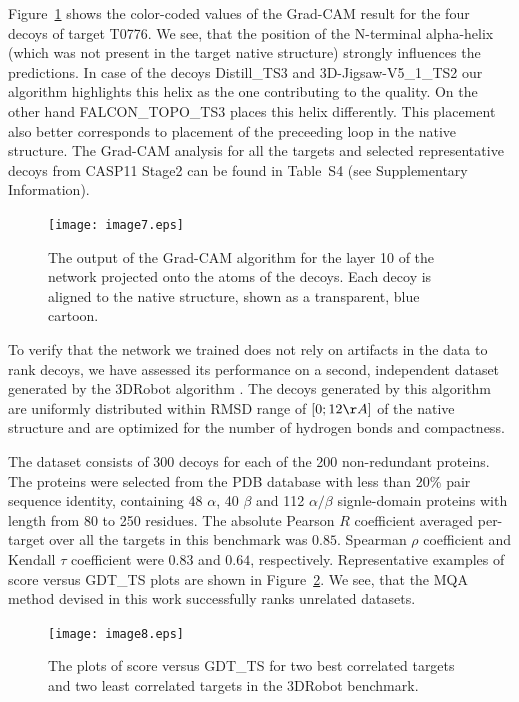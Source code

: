 \documentclass{bioinfo}
\begin{document}
Figure~\ref{Fig:GradCAMT0776_more} shows the color-coded
values of the Grad-CAM result for the four decoys of target T0776.
We see, that the position of the N-terminal alpha-helix (which was not present in the target native structure) 
strongly influences the predictions. In case of the decoys Distill\_TS3 and 3D-Jigsaw-V5\_1\_TS2 our algorithm 
highlights this helix as the one contributing to the quality. On the other hand FALCON\_TOPO\_TS3 places this helix 
differently. This placement also better corresponds to placement of the preceeding loop in the native structure.
The Grad-CAM analysis for all the targets and selected representative decoys from CASP11 Stage2 can be found in 
Table~S4 (see Supplementary Information).
\begin{figure}[!tpb]
    \texttt{[image: image7.eps]}
    \caption{The output of the Grad-CAM algorithm for the layer 10 of the network
    projected onto the atoms of the decoys. Each decoy is aligned to
    the native structure, shown as a transparent, blue cartoon.}
    \label{Fig:GradCAMT0776_more}
\end{figure}

To verify that the network we trained does not rely on artifacts in
the data to rank decoys, we have assessed its performance on a second,
independent dataset generated by the 3DRobot
algorithm \citep{deng20163drobot}. The decoys generated by this
algorithm are uniformly distributed within RMSD range of $[0; 12\AA]$
of the native structure and are optimized for the number of hydrogen
bonds and compactness.

The dataset consists of 300 decoys for each of the 200 non-redundant proteins. The proteins were 
selected from the PDB database with less than 20\% pair sequence identity, containing 48 $\alpha$, 
40 $\beta$ and 112 $\alpha/\beta$ signle-domain proteins with length from 80 to 250 residues. 
The absolute Pearson $R$ coefficient averaged per-target over all the
targets in this benchmark was $0.85$. Spearman $\rho$ coefficient
and Kendall $\tau$ coefficient were $0.83$ and $0.64$, respectively.
Representative examples of score versus GDT\_TS plots are shown in
Figure~\ref{Fig:3DRobotBenchmark}. We see, that the MQA method devised
in this work successfully ranks unrelated datasets.
\begin{figure}[!tpb]
    \centering
    \texttt{[image: image8.eps]}
    \caption{The plots of score versus GDT\_TS for two best correlated targets and two
    least correlated targets in the 3DRobot benchmark.}
    \label{Fig:3DRobotBenchmark}
\end{figure}
\end{document}
